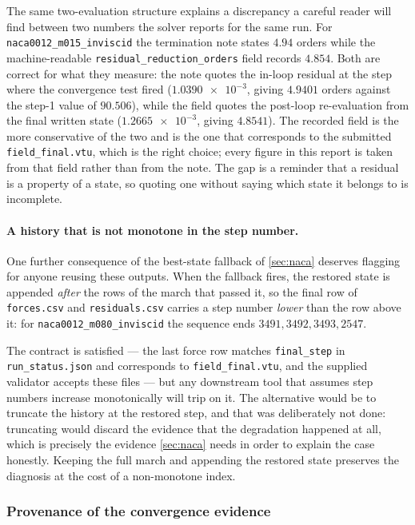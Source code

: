 The same two-evaluation structure explains a discrepancy a careful reader will find
between two numbers the solver reports for the same run. For
\texttt{naca0012\_m015\_inviscid} the termination note states $4.94$ orders while the
machine-readable \texttt{residual\_reduction\_orders} field records $4.854$. Both are
correct for what they measure: the note quotes the in-loop residual at the step where
the convergence test fired ($\num{1.0390e-3}$, giving $4.9401$ orders against the
step-1 value of $90.506$), while the field quotes the post-loop re-evaluation from the
final written state ($\num{1.2665e-3}$, giving $4.8541$). The recorded field is the
more conservative of the two and is the one that corresponds to the submitted
\texttt{field\_final.vtu}, which is the right choice; every figure in this report is
taken from that field rather than from the note. The gap is a reminder that a residual
is a property of a state, so quoting one without saying which state it belongs to is
incomplete.

\paragraph{A history that is not monotone in the step number.} One further consequence of
the best-state fallback of \cref{sec:naca} deserves flagging for anyone reusing these
outputs. When the fallback fires, the restored state is appended \emph{after} the rows of
the march that passed it, so the final row of \texttt{forces.csv} and
\texttt{residuals.csv} carries a step number \emph{lower} than the row above it: for
\texttt{naca0012\_m080\_inviscid} the sequence ends $3491, 3492, 3493, 2547$.

The contract is satisfied --- the last force row matches \texttt{final\_step} in
\texttt{run\_status.json} and corresponds to \texttt{field\_final.vtu}, and the supplied
validator accepts these files --- but any downstream tool that assumes step numbers
increase monotonically will trip on it. The alternative would be to truncate the history
at the restored step, and that was deliberately not done: truncating would discard the
evidence that the degradation happened at all, which is precisely the evidence
\cref{sec:naca} needs in order to explain the case honestly. Keeping the full march and
appending the restored state preserves the diagnosis at the cost of a non-monotone index.

\subsubsection{Provenance of the convergence evidence}
\label{sec:provenance}

